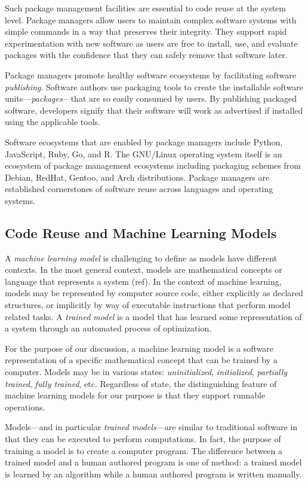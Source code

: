 \documentclass{article}
\begin{document}
Such package management facilities are essential to code reuse at the
system level. Package managers allow users to maintain complex
software systems with simple commands in a way that preserves their
integrity. They support rapid experimentation with new software as
users are free to install, use, and evaluate packages with the
confidence that they can safely remove that software later.

Package managers promote healthy software ecosystems by facilitating
software \emph{publishing}. Software authors use packaging tools to
create the installable software units---\emph{packages}---that are so
easily consumed by users. By publishing packaged software, developers
signify that their software will work as advertised if installed using
the applicable tools.

Software ecosystems that are enabled by package managers include
Python, JavaScript, Ruby, Go, and R. The GNU/Linux operating system
itself is an ecosystem of package management ecosystems including
packaging schemes from Debian, RedHat, Gentoo, and Arch
distributions. Package managers are established cornerstones of
software reuse across languages and operating systems.

\subsection{Code Reuse and Machine Learning Models}

A \emph{machine learning model} is challenging to define as models
have different contexts. In the most general context, models are
mathematical concepts or language that represents a system (ref). In
the context of machine learning, models may be represented by computer
source code, either explicitly as declared structures, or implicitly
by way of executable instructions that perform model related tasks. A
\emph{trained model} is a model that has learned some representation
of a system through an automated process of optimization.

For the purpose of our discussion, a machine learning model is a
software representation of a specific mathematical concept that can be
trained by a computer. Models may be in various states:
\emph{uninitialized}, \emph{initialized}, \emph{partially trained},
\emph{fully trained}, etc. Regardless of state, the distinguishing
feature of machine learning models for our purpose is that they
support runnable operations.

Models---and in particular \emph{trained models}---are similar to
traditional software in that they can be executed to perform
computations. In fact, the purpose of training a model is to create a
computer program. The difference between a trained model and a human
authored program is one of method: a trained model is learned by an
algorithm while a human authored program is written manually.
\end{document}
